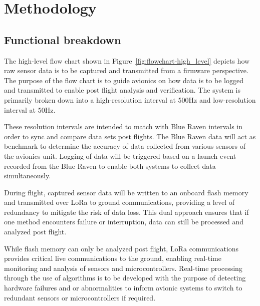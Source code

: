 \section{Methodology}
\subsection{Functional breakdown}
The high-level flow chart shown in Figure~\ref{fig:flowchart-high_level} depicts how raw sensor data is to be captured and transmitted from a firmware perspective.  The purpose of the flow chart is to guide avionics on how data is to be logged and transmitted to enable post flight analysis and verification. The system is primarily broken down into a high-resolution interval at 500Hz and low-resolution interval at 50Hz. 

These resolution intervals are intended to match with Blue Raven intervals in order to sync and compare data sets post flights. The Blue Raven data will act as benchmark to determine the accuracy of data collected from various sensors of the avionics unit. Logging of data will be triggered based on a launch event recorded from the Blue Raven to enable both systems to collect data simultaneously. 

During flight, captured sensor data will be written to an onboard flash memory and transmitted over LoRa to ground communications, providing a level of redundancy to mitigate the risk of data loss. This dual approach ensures that if one method encounters failure or interruption, data can still be processed and analyzed post flight. 

While flash memory can only be analyzed post flight, LoRa communications provides critical live communications to the ground, enabling real-time monitoring and analysis of sensors and microcontrollers. Real-time processing through the use of algorithms is to be developed with the purpose of detecting hardware failures and or abnormalities to inform avionic systems to switch to redundant sensors or microcontrollers if required.  


